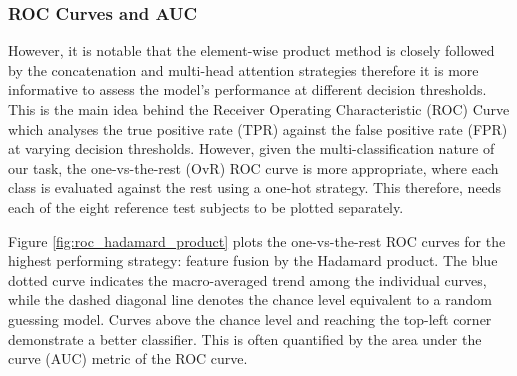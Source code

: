 \documentclass{mpaper}
\begin{document}
\subsubsection{ROC Curves and AUC}
However, it is notable that the element-wise product method is closely followed by the concatenation and multi-head attention strategies therefore it is more informative to assess the model's performance at different decision thresholds. This is the main idea behind the Receiver Operating Characteristic (ROC) Curve which analyses the true positive rate (TPR) against the false positive rate (FPR) at varying decision thresholds. However, given the multi-classification nature of our task, the one-vs-the-rest (OvR) ROC curve is more appropriate, where each class is evaluated against the rest using a one-hot strategy. This therefore, needs each of the eight reference test subjects to be plotted separately.

Figure \ref{fig:roc_hadamard_product} plots the one-vs-the-rest ROC curves for the highest performing strategy: feature fusion by the Hadamard product. The blue dotted curve indicates the macro-averaged trend among the individual curves, while the dashed diagonal line denotes the chance level equivalent to a random guessing model. Curves above the chance level and reaching the top-left corner demonstrate a better classifier. This is often quantified by the area under the curve (AUC) metric of the ROC curve. 
\end{document}
